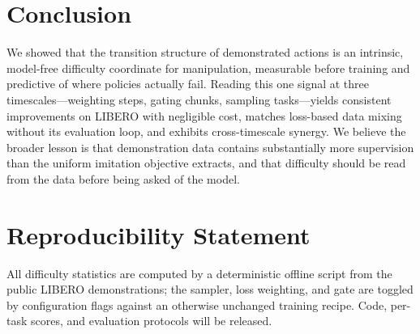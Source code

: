 \documentclass[letterpaper]{article} %
\newcommand{\libero}{LIBERO}
\begin{document}
\section{Conclusion}
We showed that the transition structure of demonstrated actions is an intrinsic, model-free difficulty coordinate for manipulation, measurable before training and predictive of where policies actually fail. Reading this one signal at three timescales---weighting steps, gating chunks, sampling tasks---yields consistent improvements on \libero{} with negligible cost, matches loss-based data mixing without its evaluation loop, and exhibits cross-timescale synergy. We believe the broader lesson is that demonstration data contains substantially more supervision than the uniform imitation objective extracts, and that difficulty should be read from the data before being asked of the model.

\section{Reproducibility Statement}
All difficulty statistics are computed by a deterministic offline script from the public \libero{} demonstrations; the sampler, loss weighting, and gate are toggled by configuration flags against an otherwise unchanged training recipe. Code, per-task scores, and evaluation protocols will be released. %


\end{document}
